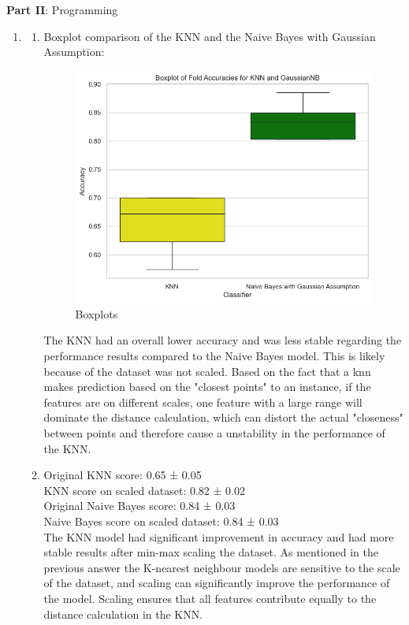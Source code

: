 \documentclass{article}
\begin{document}
\large{\textbf{Part II}: Programming}\normalsize

\begin{enumerate}[leftmargin=\labelsep]
\item \begin{enumerate}
    \item Boxplot comparison of the KNN and the Naive Bayes with Gaussian Assumption:
    
    \begin{figure}[H]  %
        \centering
        \includegraphics[width=0.8\linewidth]{img/boxplots.png}
        \caption{Boxplots}
        \label{fig:enter-label}
    \end{figure}
    
       The KNN had an overall lower accuracy and was less stable regarding the performance results compared to the Naive Bayes model. This is likely because of the dataset was not scaled. Based on the fact that a knn makes prediction based on the "closest points" to an instance, if the features are on different scales, one feature with a large range will dominate the distance calculation, which can distort the actual "closeness" between points and therefore cause a unstability in the performance of the KNN. 
    
\item 
Original KNN score: 0.65 ± 0.05 \\
KNN score on scaled dataset: 0.82 ± 0.02 \\
Original Naive Bayes score: 0.84 ± 0.03 \\
Naive Bayes score on scaled dataset: 0.84 ± 0.03 \\

The KNN model had significant improvement in accuracy and had more stable results after min-max scaling the dataset. As mentioned in the previous answer the K-nearest neighbour models are sensitive to the scale of the dataset, and scaling can significantly improve the performance of the model. Scaling ensures that all features contribute equally to the distance calculation in the KNN. 


\end{enumerate}
\end{enumerate}
\end{document}
